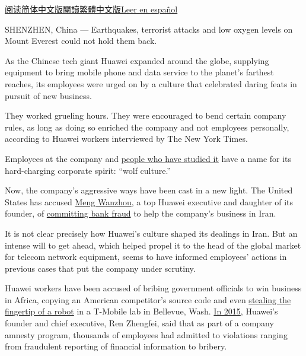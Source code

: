 \href{https://cn.nytimes.com/technology/20181219/huawei-workers-iran-sanctions/}{阅读简体中文版}\href{https://cn.nytimes.com/technology/20181219/huawei-workers-iran-sanctions/zh-hant/}{閱讀繁體中文版}\href{https://www.nytimes.com/es/2018/12/20/huawei-cultura-arresto}{Leer
en español}

SHENZHEN, China --- Earthquakes, terrorist attacks and low oxygen levels
on Mount Everest could not hold them back.

As the Chinese tech giant Huawei expanded around the globe, supplying
equipment to bring mobile phone and data service to the planet's
farthest reaches, its employees were urged on by a culture that
celebrated daring feats in pursuit of new business.

They worked grueling hours. They were encouraged to bend certain company
rules, as long as doing so enriched the company and not employees
personally, according to Huawei workers interviewed by The New York
Times.

Employees at the company and
\href{https://www.lowyinstitute.org/the-interpreter/weekend-catch-huawei-wolf-culture-and-more}{people
who have studied it} have a name for its hard-charging corporate spirit:
``wolf culture.''

Now, the company's aggressive ways have been cast in a new light. The
United States has accused
\href{https://www.nytimes.com/2018/12/07/technology/meng-wanzhou-huawei-arrest.html}{Meng
Wanzhou}, a top Huawei executive and daughter of its founder, of
\href{https://www.nytimes.com/2018/12/14/business/huawei-meng-hsbc-canada.html}{committing
bank fraud} to help the company's business in Iran.

It is not clear precisely how Huawei's culture shaped its dealings in
Iran. But an intense will to get ahead, which helped propel it to the
head of the global market for telecom network equipment, seems to have
informed employees' actions in previous cases that put the company under
scrutiny.

Huawei workers have been accused of bribing government officials to win
business in Africa, copying an American competitor's source code and
even
\href{https://www.nytimes.com/2014/09/06/business/t-mobile-accuses-huawei-of-theft-from-laboratory.html}{stealing
the fingertip of a robot} in a T-Mobile lab in Bellevue, Wash.
\href{https://bits.blogs.nytimes.com/2015/01/22/thousands-of-huawei-workers-respond-to-internal-anti-fraud-campaign/}{In
2015}, Huawei's founder and chief executive, Ren Zhengfei, said that as
part of a company amnesty program, thousands of employees had admitted
to violations ranging from fraudulent reporting of financial information
to bribery.


